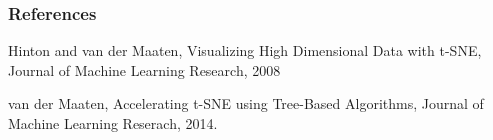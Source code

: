 \documentclass{beamer}
\begin{document}
 \begin{frame}
   \frametitle{References}

   Hinton and van der Maaten, Visualizing High Dimensional Data with t-SNE, Journal of Machine Learning Research, 2008
   \bigskip\noindent

   van der Maaten, Accelerating t-SNE using Tree-Based Algorithms, Journal of Machine Learning Reserach, 2014.
 \end{frame}
 
  
\end{document}
